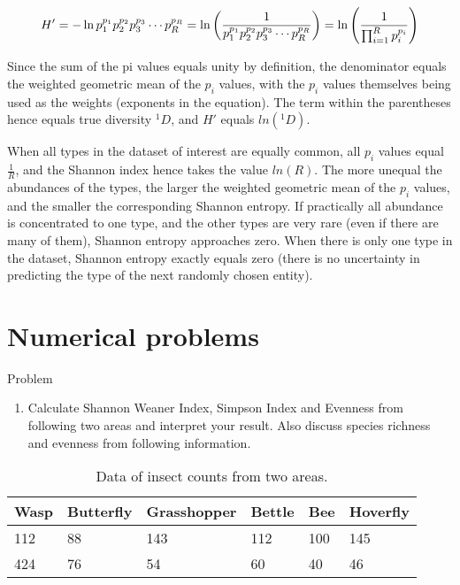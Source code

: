 \documentclass[
  ignorenonframetext,
  aspectratio=169]{beamer}
\providecommand{\tightlist}{%
  \setlength{\itemsep}{0pt}\setlength{\parskip}{0pt}}
\begin{document}
\begin{frame}{}
\protect\hypertarget{section-1}{}
\footnotesize

\[
H'=-\ln p_{1}^{p_{1}}p_{2}^{p_{2}}p_{3}^{p_{3}}\cdots p_{R}^{p_{R}}=\ln \left({1 \over p_{1}^{p_{1}}p_{2}^{p_{2}}p_{3}^{p_{3}}\cdots p_{R}^{p_{R}}}\right)=\ln \left({1 \over {\prod _{i=1}^{R}p_{i}^{p_{i}}}}\right)
\]

Since the sum of the pi values equals unity by definition, the
denominator equals the weighted geometric mean of the \(p_i\) values,
with the \(p_i\) values themselves being used as the weights (exponents
in the equation). The term within the parentheses hence equals true
diversity \({}^1 D\), and \(H'\) equals \(ln({}^1 D)\).

When all types in the dataset of interest are equally common, all
\(p_i\) values equal \(\frac{1}{R}\), and the Shannon index hence takes
the value \(ln(R)\). The more unequal the abundances of the types, the
larger the weighted geometric mean of the \(p_i\) values, and the
smaller the corresponding Shannon entropy. If practically all abundance
is concentrated to one type, and the other types are very rare (even if
there are many of them), Shannon entropy approaches zero. When there is
only one type in the dataset, Shannon entropy exactly equals zero (there
is no uncertainty in predicting the type of the next randomly chosen
entity).
\end{frame}

\hypertarget{numerical-problems}{%
\section{Numerical problems}\label{numerical-problems}}

\begin{frame}{Problem}
\protect\hypertarget{problem}{}
\begin{enumerate}
\tightlist
\item
  Calculate Shannon Weaner Index, Simpson Index and Evenness from
  following two areas and interpret your result. Also discuss species
  richness and evenness from following information.
\end{enumerate}

\begin{table}

\caption{\label{tab:insect-area-comparison}Data of insect counts from two areas.}
\centering
\fontsize{8}{10}\selectfont
\begin{tabular}[t]{llllll}
\toprule
Wasp & Butterfly & Grasshopper & Bettle & Bee & Hoverfly\\
\midrule
112 & 88 & 143 & 112 & 100 & 145\\
424 & 76 & 54 & 60 & 40 & 46\\
\bottomrule
\end{tabular}
\end{table}
\end{frame}
\end{document}
